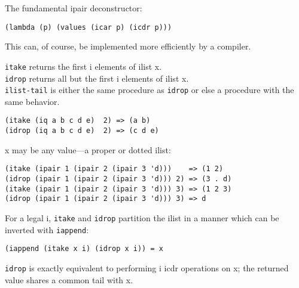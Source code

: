 \begin{entry}{%
  }

  The fundamental ipair deconstructor:

\begin{verbatim}
(lambda (p) (values (icar p) (icdr p)))
\end{verbatim}

  This can, of course, be implemented more efficiently by a compiler.
\end{entry}

\begin{entry}{%
  }

  \texttt{itake} returns the first i elements of ilist x.\\
  \texttt{idrop} returns all but the first i elements of ilist x.\\
  \texttt{ilist-tail} is either the same procedure as \texttt{idrop}
  or else a procedure with the same behavior.

\begin{verbatim}
(itake (iq a b c d e)  2) => (a b)
(idrop (iq a b c d e)  2) => (c d e)
\end{verbatim}

  x may be any value---a proper or dotted ilist:

\begin{verbatim}
(itake (ipair 1 (ipair 2 (ipair 3 'd)))    => (1 2)
(idrop (ipair 1 (ipair 2 (ipair 3 'd))) 2) => (3 . d)
(itake (ipair 1 (ipair 2 (ipair 3 'd))) 3) => (1 2 3)
(idrop (ipair 1 (ipair 2 (ipair 3 'd))) 3) => d
\end{verbatim}

  For a legal i, \texttt{itake} and \texttt{idrop} partition the ilist
  in a manner which can be inverted with \texttt{iappend}:

\begin{verbatim}
(iappend (itake x i) (idrop x i)) = x
\end{verbatim}

  \texttt{idrop} is exactly equivalent to performing i icdr operations
  on x; the returned value shares a common tail with x.
\end{entry}

